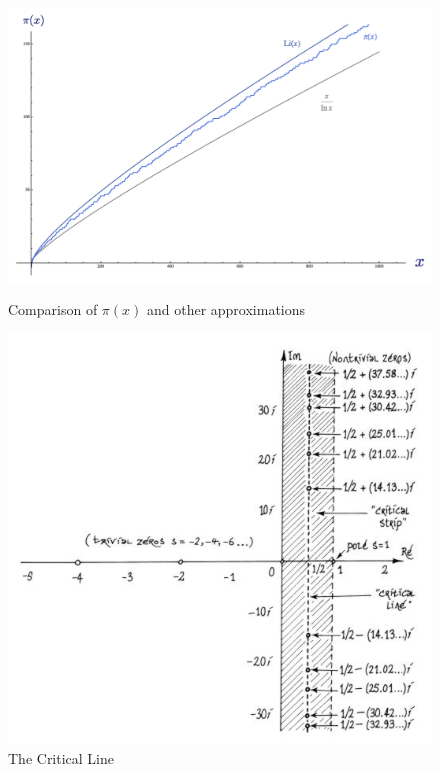 \documentclass[12pt]{article}
\theoremstyle{plain}
\begin{document}
		\begin{figure}[t]
			\centering
			\includegraphics[scale=.4]{pix.png}
			\caption{Comparison of $ \pi(x) $ and other approximations}
			\label{fig:pix}
			
			\centering
			\includegraphics[scale=.5]{critical_line.jpg}
			\caption{The Critical Line}
			\label{fig:critical_line}
		\end{figure}		


	
\end{document}
